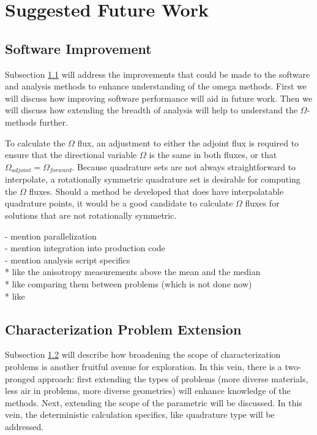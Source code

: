 \section{Suggested Future Work}
\label{sec:futurewrk}

\subsection{Software Improvement}
\label{subsec:softwareimp}

Subsection \ref{subsec:softwareimp} will address the improvements that could be
made to the software and analysis methods to enhance understanding of the omega
methods. First we will discuss how improving software performance will aid in
future work. Then we will discuss how extending the breadth of analysis will
help to understand the $\Omega$-methods further.

To calculate the $\Omega$ flux, an adjustment to either the adjoint flux is
required to ensure that the directional variable $\Omega$ is the same in both
fluxes, or that $\Omega_{adjoint} = \Omega_{forward}$. Because quadrature sets
are not always straightforward to interpolate, a rotationally symmetric
quadrature set is desirable for computing the $\Omega$ fluxes. Should a method
be developed that does have interpolatable quadrature points, it would be a good
candidate to calculate $\Omega$ fluxes for solutions that are not
rotationally symmetric.

- mention parallelization \\
- mention integration into production code \\
- mention analysis script specifics \\
* like the anisotropy measurements above the mean and the median \\
* like comparing them between problems (which is not done now) \\
* like

\subsection{Characterization Problem Extension}
\label{subsec:extendcharprobs}

Subsection \ref{subsec:extendcharprobs} will describe how broadening the scope
of characterization problems is another fruitful avenue for exploration. In this
vein, there is a two-pronged approach: first extending the types of problems
(more diverse materials, less air in problems, more diverse geometries) will
enhance knowledge of the methods. Next, extending the scope of the parametric
will be discussed. In this vein, the deterministic calculation specifics, like
quadrature type will be addressed.

